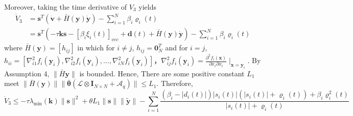 \documentclass[12pt, a4paper, oneside]{ctexbook}
\begin{document}
Moreover, taking the time derivative of $V_3$ yields
\begin{equation}
    \begin{aligned}
    \dot{V}_3&={\mathbf{s}}^T(\dot{\mathbf{v}}+\bar{H}(\mathbf{y})\dot{\mathbf{y}}) - \sum_{i = 1}^{N} \beta_i\varrho_i(t)\\
    &={\mathbf{s}}^T(-\tau\mathbf{k}\mathbf{s}-[\beta_i\xi_i(t)]_{vec}+\mathbf{d}(t) +\bar{H}(\mathbf{y})\dot{\mathbf{y}}) - \sum_{i = 1}^{N} \beta_i\varrho_i(t)
    \end{aligned}
\end{equation}
where $\bar{H}(\mathbf{y})=[h_{ij}]$ in which for $i \neq j$, $h_{ij} = \mathbf{0}_N^T$ and for $i = j$, $h_{ii}=[\nabla_{i1}^{2}f_{i}(\mathbf{y}_{i}),\nabla_{i2}^{2}f_{i}(\mathbf{y}_{i}),\ldots,\nabla_{iN}^{2}f_{i}(\mathbf{y}_{i})]$，$\nabla_{ij}^{2}f_{i}(\mathbf{y}_{i})=\frac{\partial^{2}f_{i}(\mathbf{x})}{\partial x_{i}\partial x_{i}}\mid_{\mathbf{x}=\mathbf{y}_{i}}$. By Assumption 4, $\|\bar{H}\mathbf{y}\|$ is bounded. Hence, There are some positive constant $L_1$ meet $\|\bar{H}(\mathbf{y})\|\|\bar{\boldsymbol{\theta}}(\mathcal{L}\otimes \mathbf{I}_{N\times N}+\mathcal{A}_{q})\|\leq L_{1}$. Therefore,
\begin{equation}
    \dot{V}_3\leq-\tau\lambda_{\min}(\mathbf{k})\|{\mathbf{s}}\|^2+\theta L_1\|{\mathbf{s}}\|\|\tilde{\mathbf{y}}\|-\sum_{i = 1}^{N}\frac{(\beta_i - |d_i(t)|)|s_i(t)|(|s_i(t)|+\varrho_i(t)) + \beta_i\varrho_i^2(t)}{|s_i(t)| + \varrho_i(t)}
\end{equation}
\end{document}

